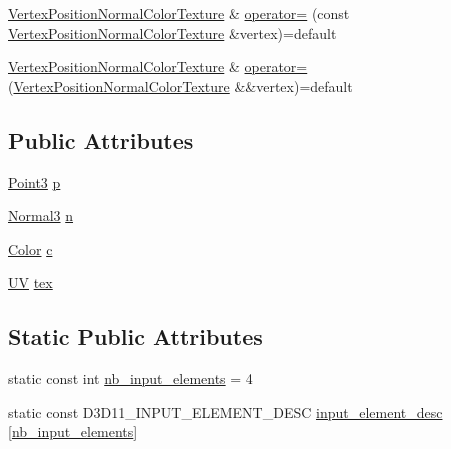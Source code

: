 \begin{DoxyCompactItemize}
\item 
\hyperlink{structmage_1_1_vertex_position_normal_color_texture}{Vertex\+Position\+Normal\+Color\+Texture} \& \hyperlink{structmage_1_1_vertex_position_normal_color_texture_a2053f5942c404f3d42f6e5a129c3e694}{operator=} (const \hyperlink{structmage_1_1_vertex_position_normal_color_texture}{Vertex\+Position\+Normal\+Color\+Texture} \&vertex)=default
\item 
\hyperlink{structmage_1_1_vertex_position_normal_color_texture}{Vertex\+Position\+Normal\+Color\+Texture} \& \hyperlink{structmage_1_1_vertex_position_normal_color_texture_a98da26b1f52c0b98b44fd3a99080615a}{operator=} (\hyperlink{structmage_1_1_vertex_position_normal_color_texture}{Vertex\+Position\+Normal\+Color\+Texture} \&\&vertex)=default
\end{DoxyCompactItemize}
\subsection*{Public Attributes}
\begin{DoxyCompactItemize}
\item 
\hyperlink{structmage_1_1_point3}{Point3} \hyperlink{structmage_1_1_vertex_position_normal_color_texture_ac7808865ca6672b7d0f4f8457077bd16}{p}
\item 
\hyperlink{structmage_1_1_normal3}{Normal3} \hyperlink{structmage_1_1_vertex_position_normal_color_texture_a7304bf677ad4f16aea974e63f4324eba}{n}
\item 
\hyperlink{structmage_1_1_color}{Color} \hyperlink{structmage_1_1_vertex_position_normal_color_texture_a6b28cefeab374c3f38c44b49eea2ec78}{c}
\item 
\hyperlink{structmage_1_1_u_v}{UV} \hyperlink{structmage_1_1_vertex_position_normal_color_texture_a3477ce06d0778a1119cbf2e961d7c3ed}{tex}
\end{DoxyCompactItemize}
\subsection*{Static Public Attributes}
\begin{DoxyCompactItemize}
\item 
static const int \hyperlink{structmage_1_1_vertex_position_normal_color_texture_a6a4a2cf057a12027ad47df9651021bdb}{nb\+\_\+input\+\_\+elements} = 4
\item 
static const D3\+D11\+\_\+\+I\+N\+P\+U\+T\+\_\+\+E\+L\+E\+M\+E\+N\+T\+\_\+\+D\+E\+SC \hyperlink{structmage_1_1_vertex_position_normal_color_texture_af00c662c12d40c1fffe5df6896a95f82}{input\+\_\+element\+\_\+desc} \mbox{[}\hyperlink{structmage_1_1_vertex_position_normal_color_texture_a6a4a2cf057a12027ad47df9651021bdb}{nb\+\_\+input\+\_\+elements}\mbox{]}
\end{DoxyCompactItemize}


